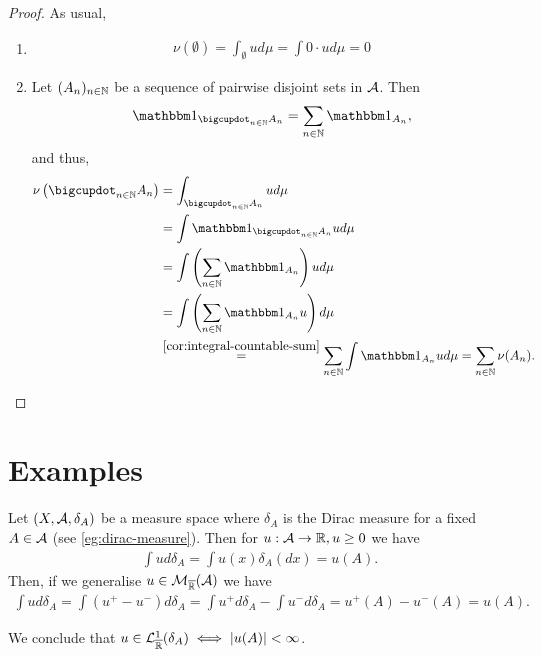 \begin{proof}
	As usual,
	\begin{enumerate}
		\item
		\begin{align*}
			\nu(\emptyset) = \int_\emptyset u d\mu = \int 0 \cdot u d\mu = 0
		\end{align*}
		
		\item Let $(A_n)_{n\in\mathbb{N}}$ be a sequence of pairwise disjoint sets in $\mathcal{A}$. Then
		\begin{align*}
			\ind_{\bigcupdot_{n\in\N} A_n} = \sum_{n\in\N} \ind_{A_n},
		\end{align*}
		and thus,
		\begin{align*}
			\nu\left(\bigcupdot_{n\in\N} A_n\right)
			&= \int_{\bigcupdot_{n\in\N} A_n} u d\mu \\
			&= \int \ind_{\bigcupdot_{n\in\N} A_n} u d\mu \\
			&= \int \left(\sum_{n\in\N} \ind_{A_n}\right) u d \mu \\
			&= \int \left(\sum_{n\in\N}\ind_{A_n} u\right) d\mu \\
			&\overset{\ref{cor:integral-countable-sum}}{=} \sum_{n\in\N} \int \ind_{A_n} u d\mu
			= \sum_{n\in\N} \nu(A_n).
		\end{align*}
	\end{enumerate}
\end{proof}

\section{Examples}

\begin{eg}
	Let $(X, \mathcal{A}, \delta_A)$ be a measure space where $\delta_A$ is the Dirac measure for a fixed $A \in \mathcal{A}$ (see \autoref{eg:dirac-measure}). Then for $u: \mathcal{A} \to \mathbb{R}, u \geq 0$ we have
	\begin{align*}
		\int u d\delta_A = \int u(x) \delta_A(dx) = u(A).
	\end{align*} 
	Then, if we generalise $u \in \mathcal{M}_{\overline{\mathbb{R}}}(\mathcal{A})$ we have
	\begin{align*}
		\int u d\delta_A = \int (u^+ - u^-)d\delta_A = \int u^+d\delta_A - \int u^- d \delta_A = u^+(A) - u^-(A) = u(A).
	\end{align*}
	
	We conclude that $u \in \mathcal{L}_{\overline{\mathbb{R}}}^1(\delta_A) \iff \left\vert{u(A)}\right\vert < \infty$.
\end{eg}

